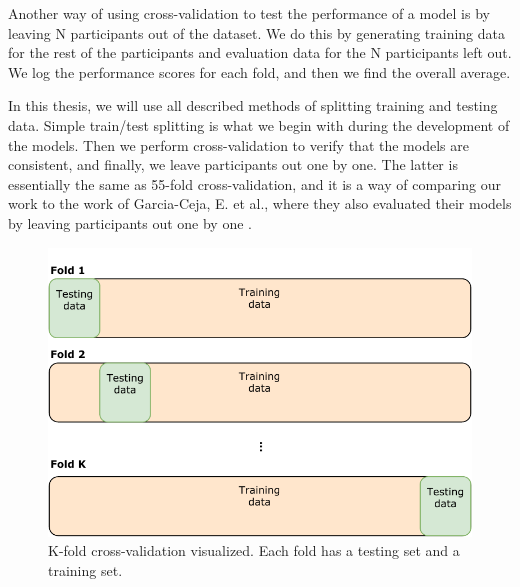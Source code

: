 Another way of using cross-validation to test the performance of a model is by leaving N participants out of the dataset. We do this by generating training data for the rest of the participants and evaluation data for the N participants left out. We log the performance scores for each fold, and then we find the overall average. 

In this thesis, we will use all described methods of splitting training and testing data. Simple train/test splitting is what we begin with during the development of the models. Then we perform cross-validation to verify that the models are consistent, and finally, we leave participants out one by one. The latter is essentially the same as 55-fold cross-validation, and it is a way of comparing our work to the work of Garcia-Ceja, E. et al., where they also evaluated their models by leaving participants out one by one \cite{GarciaCeja2018_classification_bipolar}. 


\begin{figure}
\begin{center}
  \includegraphics{img/Cross-validation.pdf}
  \caption{K-fold cross-validation visualized. Each fold has a testing set and a training set.}
  \label{figure:dataset_cross_val}
\end{center}  
\end{figure}